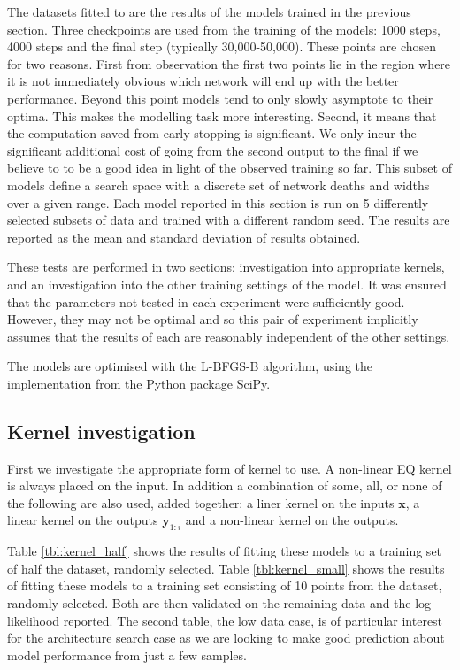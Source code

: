 The datasets fitted to are the results of the models trained in the previous section. Three checkpoints are used from the training of the models: 1000 steps, 4000 steps and the final step (typically 30,000-50,000). These points are chosen for two reasons. First from observation the first two points lie in the region where it is not immediately obvious which network will end up with the better performance. Beyond this point models tend to only slowly asymptote to their optima. This makes the modelling task more interesting. Second, it means that the computation saved from early stopping is significant. We only incur the significant additional cost of going from the second output to the final if we believe to to be a good idea in light of the observed training so far. This subset of models define a search space with a discrete set of network deaths and widths over a given range. Each model reported in this section is run on 5 differently selected subsets of data and trained with a different random seed. The results are reported as the mean and standard deviation of results obtained. 

These tests are performed in two sections: investigation into appropriate kernels, and an investigation into the other training settings of the model. It was ensured that the parameters not tested in each experiment were sufficiently good. However, they may not be optimal and so this pair of experiment implicitly assumes that the results of each are reasonably independent of the other settings.

The models are optimised with the L-BFGS-B algorithm, using the implementation from the Python package SciPy.

\subsection{Kernel investigation}

First we investigate the appropriate form of kernel to use. A non-linear EQ kernel is always placed on the input. In addition a combination of some, all, or none of the following are also used, added together: a liner kernel on the inputs \( \mathbf{x} \), a linear kernel on the outputs \( \mathbf{y}_{1:i} \) and a non-linear kernel on the outputs.

Table \ref{tbl:kernel_half} shows the results of fitting these models to a training set of half the dataset, randomly selected. Table \ref{tbl:kernel_small} shows the results of fitting these models to a training set consisting of 10 points from the dataset, randomly selected. Both are then validated on the remaining data and the log likelihood reported. The second table, the low data case, is of particular interest for the architecture search case as we are looking to make good prediction about model performance from just a few samples.


